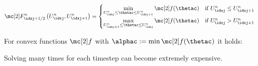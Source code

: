 \begin{defnbox}\nospacing
    \begin{defn}\label{defn:godunov_flux}
        \begin{align}
          \Flux^{n}_{\idxj+1/2}\left(U_{\idxj}^{n},U_{\idxj+1}^{n}\right)=
          \begin{cases}
            \min\limits_{U_{\idxj}^{n}\leq\thetac\leq U_{\idxj+1}^{n}}\flux(\thetac)&\text{if }U_{\idxj}^{n}\leq U_{\idxj+1}^{n}\\
            \max\limits_{U_{\idxj+1}^{n}\leq\thetac\leq U_{\idxj}^{n}}\flux(\thetac)&\text{if }U_{\idxj}^{n}> U_{\idxj+1}^{n}\label{eq:godunov_flux}
          \end{cases}
        \end{align}
    \end{defn}
\end{defnbox}
\begin{corbox}\nospacing
    \begin{cor}\label{cor:godunov_flux_for_convex_functions}\leavevmode
        For convex functions $\flux$ with $\alphac:=\min\flux(\thetac)$ it holds:\leavevmode\\
    \end{cor}
\end{corbox}
\begin{sectionbox}\nospacing
\begin{conslist}
    \item Solving  many times for each timestep can become extremely expensive.
\end{conslist}
\end{sectionbox}
